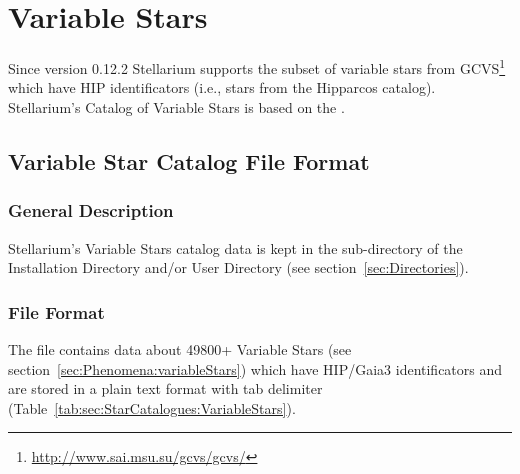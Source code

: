\clearpage

\section{Variable Stars}
\label{sec:StarCatalogues:VariableStars}

Since version 0.12.2 Stellarium supports the subset of variable stars
from GCVS\footnote{\url{http://www.sai.msu.su/gcvs/gcvs/}} which have HIP
identificators (i.e., stars from the Hipparcos catalog). Stellarium's Catalog
of Variable Stars is based on the .

\subsection{Variable Star Catalog File Format}
\label{sec:StarCatalogues:VariableStars:format}

\subsubsection{General Description}%
\label{sec:StarCatalogues:VariableStars:general}

Stellarium's Variable Stars catalog data is kept
in the  sub-directory of the Installation Directory and/or
User Directory (see section~\ref{sec:Directories}).


\subsubsection{File Format}%
\label{sec:StarCatalogues:VariableStars:file}

The  file contains data about 49800+ Variable Stars 
(see section~\ref{sec:Phenomena:variableStars}) which have HIP/Gaia3 identificators and
are stored in a plain text format with tab delimiter (Table~\ref{tab:sec:StarCatalogues:VariableStars}).

